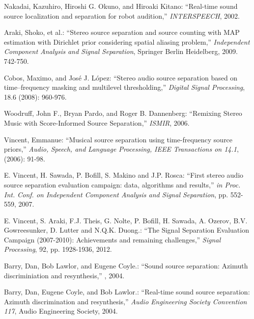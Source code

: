 \documentclass{sig-alternate}
\begin{document}
\begin{thebibliography}{citations}

Nakadai, Kazuhiro, Hiroshi G. Okuno, and Hiroaki Kitano:
``Real-time sound source localization and separation for robot audition,''
{\it INTERSPEECH},
2002.

Araki, Shoko, et al.:
``Stereo source separation and source counting with MAP estimation with Dirichlet prior considering spatial aliasing problem,''
{\it Independent Component Analysis and Signal Separation},
Springer Berlin Heidelberg, 2009. 742-750.

Cobos, Maximo, and José J. López:
``Stereo audio source separation based on time–frequency masking and multilevel thresholding,''
{\it Digital Signal Processing},
18.6 (2008): 960-976.

Woodruff, John F., Bryan Pardo, and Roger B. Dannenberg:
``Remixing Stereo Music with Score-Informed Source Separation,''
{\it ISMIR},
2006.

Vincent, Emmanue:
``Musical source separation using time-frequency source priors,''
{\it Audio, Speech, and Language Processing, IEEE Transactions on 14.1},
(2006): 91-98.

E. Vincent, H. Sawada, P. Bofill, S. Makino and J.P. Rosca:
``First stereo audio source separation evaluation campaign: data, algorithms and results,''
{\it in Proc. Int. Conf. on Independent Component Analysis and Signal Separation},
pp. 552-559, 2007.

E. Vincent, S. Araki, F.J. Theis, G. Nolte, P. Bofill, H. Sawada, A. Ozerov, B.V. Gowreesunker, D. Lutter and N.Q.K. Duong.:
``The Signal Separation Evaluation Campaign (2007-2010): Achievements and remaining challenges,''
{\it Signal Processing},
92, pp. 1928-1936, 2012.

Barry, Dan, Bob Lawlor, and Eugene Coyle.:
``Sound source separation: Azimuth discriminiation and resynthesis,''
{\it},
2004.

Barry, Dan, Eugene Coyle, and Bob Lawlor.:
``Real-time sound source separation: Azimuth discrimination and resynthesis,''
{\it Audio Engineering Society Convention 117},
Audio Engineering Society, 2004.


\end{thebibliography}
\end{document}
